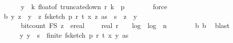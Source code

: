 \begin{isabellebody}
\ \ \ \ \ \ y\ {\isasymsubseteq}\ {\isacharparenleft}{\kern0pt}{\isasymlambda}k{\isachardot}{\kern0pt}\ float{\isacharunderscore}{\kern0pt}of\ {\isacharparenleft}{\kern0pt}truncate{\isacharunderscore}{\kern0pt}down\ r\ k{\isacharparenright}{\kern0pt}{\isacharparenright}{\kern0pt}\ {\isacharbackquote}{\kern0pt}\ {\isacharbraceleft}{\kern0pt}{}{\isachardot}{\kern0pt}{\isachardot}{\kern0pt}{\isacharless}{\kern0pt}p{\isacharbraceright}{\kern0pt}{\isachardoublequoteclose}\isanewline
\ \ \ \ \ \ \isamarkupfalse%
\ force\isanewline
\isanewline
\ \ \ \ \isamarkupfalse%
\ b{\isacharunderscore}{\kern0pt}{}{\isacharunderscore}{\kern0pt}{}{\isacharcolon}{\kern0pt}\ {\isachardoublequoteopen}{\isasymAnd}y\ z\ {\isachardot}{\kern0pt}\ y\ {\isasymin}\ {\isacharparenleft}{\kern0pt}{\isasymlambda}z{\isachardot}{\kern0pt}\ f{}{\isacharunderscore}{\kern0pt}sketch\ p\ r\ t\ {\isacharparenleft}{\kern0pt}x\ z{\isacharparenright}{\kern0pt}\ as{\isacharparenright}{\kern0pt}\ {\isacharbackquote}{\kern0pt}\ {\isacharbraceleft}{\kern0pt}{}{\isachardot}{\kern0pt}{\isachardot}{\kern0pt}{\isacharless}{\kern0pt}s{\isacharbraceright}{\kern0pt}\ {\isasymLongrightarrow}\ z\ {\isasymin}\ y\ {\isasymLongrightarrow}\ \isanewline
\ \ \ \ \ \ bit{\isacharunderscore}{\kern0pt}count\ {\isacharparenleft}{\kern0pt}F\isactrlsub S\ z{\isacharparenright}{\kern0pt}\ {\isasymle}\ ereal\ {\isacharparenleft}{\kern0pt}{}{}\ {\isacharplus}{\kern0pt}\ {}\ {\isacharasterisk}{\kern0pt}\ real\ r\ {\isacharplus}{\kern0pt}\ {}\ {\isacharasterisk}{\kern0pt}\ log\ {}\ {\isacharparenleft}{\kern0pt}log\ {}\ {\isacharparenleft}{\kern0pt}n{\isacharplus}{\kern0pt}{}{\isacharparenright}{\kern0pt}{\isacharparenright}{\kern0pt}{\isacharparenright}{\kern0pt}{\isachardoublequoteclose}\isanewline
\ \ \ \ \ \ \isamarkupfalse%
\ b{\isacharunderscore}{\kern0pt}{}{\isacharunderscore}{\kern0pt}{}{}\ b{\isacharunderscore}{\kern0pt}{}\ \isamarkupfalse%
\ blast\isanewline
\isanewline
\ \ \ \ \isamarkupfalse%
\ {\isachardoublequoteopen}{\isasymAnd}y{\isachardot}{\kern0pt}\ y\ {\isasymin}\ {\isacharbraceleft}{\kern0pt}{}{\isachardot}{\kern0pt}{\isachardot}{\kern0pt}{\isacharless}{\kern0pt}s{\isacharbraceright}{\kern0pt}\ {\isasymLongrightarrow}\ finite\ {\isacharparenleft}{\kern0pt}f{}{\isacharunderscore}{\kern0pt}sketch\ p\ r\ t\ {\isacharparenleft}{\kern0pt}x\ y{\isacharparenright}{\kern0pt}\ as{\isacharparenright}{\kern0pt}{\isachardoublequoteclose}\isanewline

\end{isabellebody}

